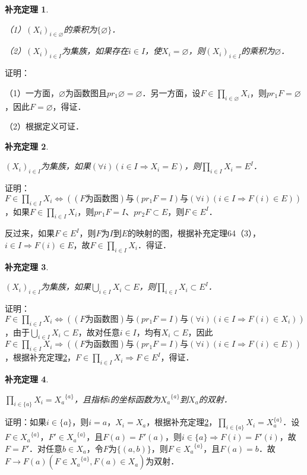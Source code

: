 \documentclass[12pt, a4paper, oneside]{book}
\newtheorem{cor}{补充定理}
\begin{document}
			\begin{cor}\label{cor127}
				\hfill\par
				（1）$(X_i)_{i\in \varnothing}$的乘积为$\{\varnothing\}$．
				\par
				（2）$(X_i)_{i\in I}$为集族，如果存在$i\in I$，使$X_i=\varnothing$，则$(X_i)_{i\in I}$的乘积为$\varnothing$．
			\end{cor}
			证明：
			\par
			（1）一方面，$\varnothing$为函数图且$pr_1\varnothing= \varnothing$．另一方面，设$F\in \prod\limits_{i\in \varnothing}X_i$，则$pr_1F= \varnothing$，因此$F=\varnothing$，得证．
			\par
			（2）根据定义可证．
			
			\begin{cor}\label{cor128}
				\hfill\par
				$(X_i)_{i\in I}$为集族，如果$(\forall i)(i\in I\Rightarrow X_i=E)$，则$\prod\limits_{i\in I}X_i=E^I$．
			\end{cor}
			证明：$F\in \prod\limits_{i\in I}X_i\Leftrightarrow ((F\text{为函数图})\text{与}(pr_1F= I)\text{与}(\forall i)(i\in I\Rightarrow F(i)\in E))$，如果$F\in \prod\limits_{i\in I}X_i$，则$ pr_1F= I$、$pr_2F\subset E$，则$F\in E^I$．
			\par
			反过来，如果$F\in E^I$，则$F$为$I$到$E$的映射的图，根据补充定理64（3），$i\in I\Rightarrow F(i)\in E$，故$F\in \prod\limits_{i\in I}X_i$．得证．
			
			\begin{cor}\label{cor129}
				\hfill\par
				$(X_i)_{i\in I}$为集族，如果$\bigcup\limits_{i\in I}X_i\subset E$，则$\prod\limits_{i\in I}X_i\subset E^I$．
			\end{cor}
			证明：$F\in \prod\limits_{i\in I}X_i\Leftrightarrow ((F\text{为函数图})\text{与}(pr_1F= I)\text{与}(\forall i)(i\in I\Rightarrow F(i)\in X_i))$，由于$\bigcup\limits_{i\in I}X_i\subset E$，故对任意$i\in I$，均有$X_i\subset E$，因此$F\in \prod\limits_{i\in I}X_i\Rightarrow ((F\text{为函数图})\text{与}(pr_1F= I)\text{与}(\forall i)(i\in I\Rightarrow F(i)\in E))$，根据补充定理\ref{cor128}，$F\in \prod\limits_{i\in I}X_i\Rightarrow F\in E^I$，得证．
			
			\begin{cor}\label{cor130}
				\hfill\par
				$\prod\limits_{i\in \{a\}}X_i={X_a}^{\{a\}}$，且指标$i$的坐标函数为${X_a}^{\{a\}}$到$X_a$的双射．
			\end{cor}
			证明：如果$i\in \{a\}$，则$i=a$，$X_i=X_a$，根据补充定理\ref{cor128}，$\prod\limits_{i\in \{a\}}X_i=X_a^{\{a\}}$．设$F\in {X_a}^{\{a\}}$，$F' \in {X_a}^{\{a\}}$，且$F(a)=F'(a)$，则$i\in \{a\}\Rightarrow F(i)=F'(i)$，故$F=F'$．对任意$b\in X_a$，令$F$为$\{(a, b)\}$，则$F\in {X_a}^{\{a\}}$，且$F(a)=b$．故$F\to F(a)(F\in {X_a}^{\{a\}}, F(a)\in X_a)$为双射．			
\end{document}
